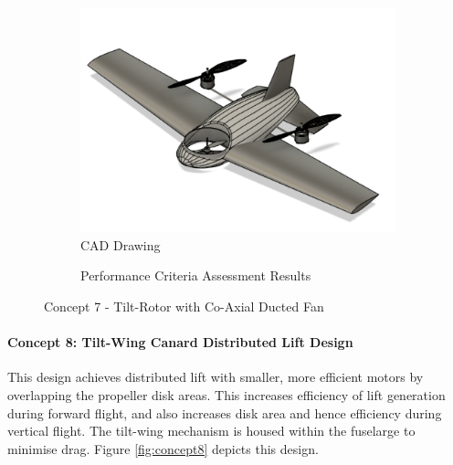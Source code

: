 \begin{figure}[H]
\centering
\begin{subfigure}[t]{.5\textwidth}
  \centering
  \includegraphics[width=0.95\linewidth]{Concepts/CAD/Round2_2_cad.png}
  \vspace{0.125cm}
  \caption{CAD Drawing}
  \label{fig:cad7}
\end{subfigure}%
\begin{subfigure}[t]{.5\textwidth}
  \centering
  \caption{Performance Criteria Assessment Results}
  \label{fig:radar7}
\end{subfigure}
\caption{Concept 7 - Tilt-Rotor with Co-Axial Ducted Fan}
\label{fig:concept7}
\end{figure}


\paragraph{Concept 8: Tilt-Wing Canard Distributed Lift Design}
This design achieves distributed lift with smaller, more efficient motors by overlapping the propeller disk areas. This increases efficiency of lift generation during forward flight, and also increases disk area and hence efficiency during vertical flight. The tilt-wing mechanism is housed within the fuselarge to minimise drag. Figure \ref{fig:concept8} depicts this design.


